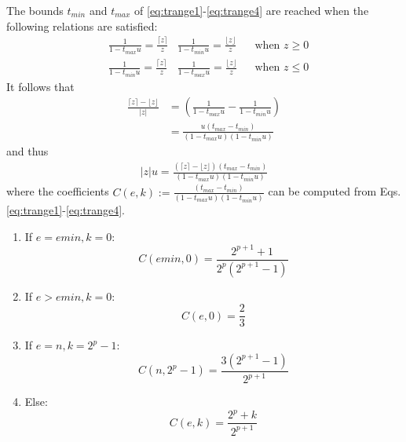 \documentclass[10pt,conference]{IEEEtran}
\newcommand{\ceil}[1]{\lceil #1 \rceil}
\newcommand{\floor}[1]{\lfloor #1 \rfloor}
\newcommand{\absv}[1]{\vert #1\vert}
\begin{document}
The bounds $t_{min}$ and $t_{max}$ of \eqref{eq:trange1}-\eqref{eq:trange4} are reached when the following relations are satisfied:
\begin{align*}
&\frac{1}{1-t_{max}u}=\frac{\ceil{z}}{z} & \frac{1}{1-t_{min}u}=\frac{\floor{z}}{z} & &\text{when } z\geq 0\\
&\frac{1}{1-t_{min}u}=\frac{\ceil{z}}{z} & \frac{1}{1-t_{max}u}=\frac{\floor{z}}{z} & &\text{when } z\leq 0
\end{align*}
It follows that 
\begin{align*}
\frac{\ceil{z}-\floor{z}}{\absv{z}}&=\left(\frac{1}{1-t_{max}u}-\frac{1}{1-t_{min}u}\right)\\
&=\frac{u(t_{max}-t_{min})}{(1-t_{max}u)(1-t_{min}u)}
\end{align*}
and thus
\begin{align}
\absv{z}u=\frac{(\ceil{z}-\floor{z})(t_{max}-t_{min})}{(1-t_{max}u)(1-t_{min}u)}\label{eq:absvzu}
\end{align}
where the coefficients $C(e,k):=\frac{(t_{max}-t_{min})}{(1-t_{max}u)(1-t_{min}u)}$ can be computed from Eqs. \eqref{eq:trange1}-\eqref{eq:trange4}.
\begin{enumerate}
\item  If $e=emin, k=0$:
\[
C(emin,0)=\frac{2^{p+1}+1}{2^p(2^{p+1}-1)}
\]
\item If $e>emin, k=0$:
\[
C(e,0)=\frac{2}{3}
\]
\item  If $e=n, k=2^p-1$:
\[
C(n,2^p-1)=\frac{3(2^{p+1}-1)}{2^{p+1}}
\]
\item Else:
\[
C(e,k)=\frac{2^p+k}{2^{p+1}}
\]
\end{enumerate}
\end{document}

